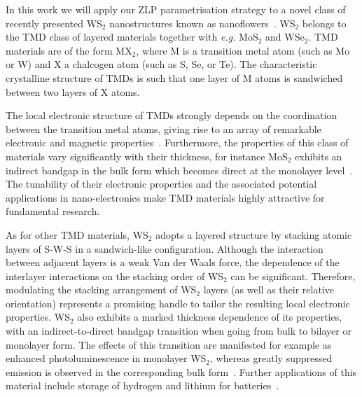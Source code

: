 In this work we will apply our ZLP parametrisation strategy
 to a novel class of recently presented WS$_2$ nanostructures known
as nanoflowers~\cite{SabryaWS2}.
%
WS$_2$ belongs to the TMD class of layered materials together with {\it e.g.}
MoS$_2$ and WSe$_2$.
%
TMD materials are of the form MX$_2$, where M is a 
transition metal atom (such as Mo or W) and X a chalcogen atom (such as S, Se, or Te). 
%
The characteristic crystalline structure of TMDs is such that
one layer of M atoms is sandwiched between two layers of X atoms.

The local electronic structure of TMDs strongly depends on the coordination 
between the transition metal atoms, giving rise to an array of remarkable electronic
and magnetic properties~\cite{Chhowalla:2013}.
%
Furthermore, the properties of this class of materials vary significantly
with their thickness, for instance MoS$_2$ exhibits an indirect bandgap
in the bulk form which becomes direct at the monolayer level~\cite{Splendiani:2010}.
%
The tunability of their electronic properties and the associated
potential applications in nano-electronics make TMD materials highly attractive for fundamental research. 

As for other TMD materials, WS$_2$ adopts a layered structure 
by stacking atomic layers of S-W-S in a sandwich-like configuration. 
%
Although the interaction between adjacent layers is a weak Van der Waals 
force, the dependence of the interlayer interactions on the stacking 
order of WS$_2$ can be significant.
%
Therefore, modulating the stacking arrangement of WS$_2$ layers (as well
as their relative orientation)
represents a promising handle to tailor the resulting local electronic properties.
%
WS$_2$ also exhibits a marked thickness dependence of
its properties, with an indirect-to-direct bandgap transition when going
from bulk to bilayer or monolayer form.
%
The effects of this transition are manifested for example as enhanced
photoluminescence in monolayer WS$_2$, whereas greatly suppressed emission is observed in
the corresponding bulk form~\cite{Zhao2013}.
%
Further applications of this material include storage of hydrogen 
and lithium for batteries~\cite{Bhandavat:2012}.

